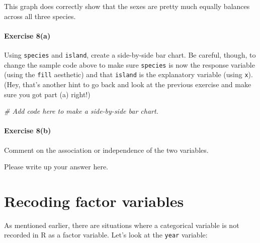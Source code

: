 \documentclass[
]{book}
\newenvironment{Shaded}{\begin{snugshade}}{\end{snugshade}}
\newcommand{\CommentTok}[1]{\textcolor[rgb]{0.56,0.35,0.01}{\textit{#1}}}
\newcommand{\FunctionTok}[1]{\textcolor[rgb]{0.00,0.00,0.00}{#1}}
\newcommand{\NormalTok}[1]{#1}
\newcommand{\SpecialCharTok}[1]{\textcolor[rgb]{0.00,0.00,0.00}{#1}}
\begin{document}
This graph does correctly show that the sexes are pretty much equally balances across all three species.

\hypertarget{exercise-8a}{%
\paragraph*{Exercise 8(a)}\label{exercise-8a}}

Using \texttt{species} and \texttt{island}, create a side-by-side bar chart. Be careful, though, to change the sample code above to make sure \texttt{species} is now the response variable (using the \texttt{fill} aesthetic) and that \texttt{island} is the explanatory variable (using \texttt{x}). (Hey, that's another hint to go back and look at the previous exercise and make sure you got part (a) right!)

\begin{Shaded}
\begin{Highlighting}[]
\CommentTok{\# Add code here to make a side{-}by{-}side bar chart.}
\end{Highlighting}
\end{Shaded}

\hypertarget{exercise-8b}{%
\paragraph*{Exercise 8(b)}\label{exercise-8b}}

Comment on the association or independence of the two variables.

Please write up your answer here.

\hypertarget{categorical-recoding}{%
\section{Recoding factor variables}\label{categorical-recoding}}

As mentioned earlier, there are situations where a categorical variable is not recorded in R as a factor variable. Let's look at the \texttt{year} variable:

\begin{Shaded}
\end{Shaded}
\end{document}

